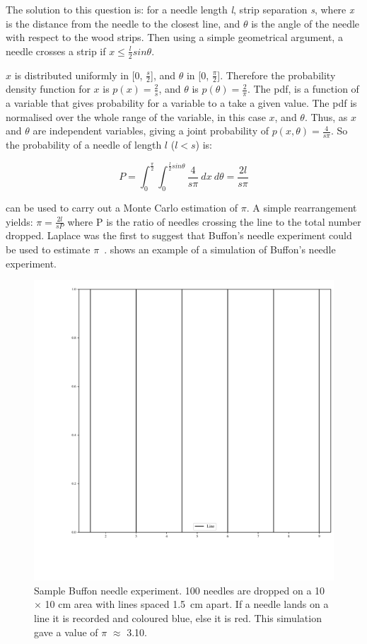 The solution to this question is:
for a needle length \textit{l}, strip separation \textit{s}, where \textit{x} is the distance from the needle to the closest line, and $\theta$ is the angle of the needle with respect to the wood strips. Then using a simple geometrical argument, a needle crosses a strip if $x \leq \tfrac{l}{2} sin \theta$.

$x$ is distributed uniformly in [0, $\tfrac{s}{2}$], and $\theta$ in [0, $\tfrac{\pi}{2}$]. Therefore the probability density function for $x$ is $p(x)=\tfrac{2}{s}$, and $\theta$ is $p(\theta) = \tfrac{2}{\pi}$. The \gls*{pdf}, is a function of a variable that gives probability for a variable to a take a given value. The \gls*{pdf} is normalised over the whole range of the variable, in this case $x$, and $\theta$.
Thus, as $x$ and $\theta$ are independent variables, giving a joint probability of $p(x,\theta) = \tfrac{4}{s \pi}$.
So the probability of a needle of length $l$ ($l<s$) is:

\begin{equation}
P=\int_0^{\frac{\pi}{2}}\int_0^{\frac{l}{2}sin\theta}\frac{4}{s\pi}\ dx\ d\theta = \frac{2 l}{s \pi}\label{eqn:buffon}
\end{equation}


 can be used to carry out a Monte Carlo estimation of $\pi$. A simple rearrangement yields: $\pi = \tfrac{2l}{sP}$ where P is the ratio of needles crossing the line to the total number dropped. Laplace was the first to suggest that Buffon's needle experiment could be used to estimate $\pi$~\cite{beckmann2015history}. 
 shows an example of a simulation of Buffon's needle experiment.

\begin{figure}[!htb]
\centering
\includegraphics[width=.65\textwidth]{buffon.pdf}
\caption{Sample Buffon needle experiment. 100 needles are dropped on a 10 $\times$ 10 cm area with lines spaced 1.5~cm apart. If a needle lands on a line it is recorded and coloured blue, else it is red. This simulation gave a value of $\pi$ $\approx$ 3.10.}
\label{fig:buffon-needle}
\end{figure}

